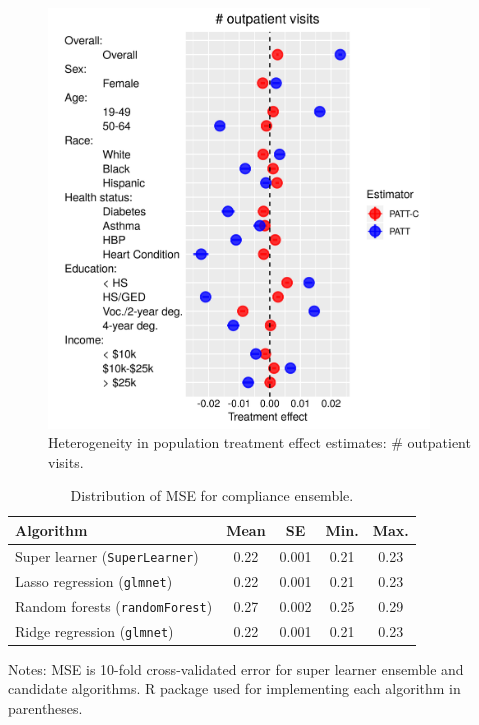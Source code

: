 \documentclass[hidelinks,12pt]{article}
\begin{document}
\begin{appendices}
\begin{figure}[htbp]
	\begin{center}
		\includegraphics[width = 0.9\textwidth]{num-out-plot.png}
		\caption{Heterogeneity in population treatment effect estimates: $\#$ outpatient visits.\label{fig:num-out-plot}}
	\end{center}
\end{figure}

\begin{table}[h]
\begin{center}
\caption{Distribution of MSE for compliance ensemble.\label{compliance-ensemble}} 
\begin{tabular}{lcccc}
  \hline
 Algorithm & Mean & SE & Min. & Max. \\ 
  \hline
        \rowcolor{Gray}
Super learner (\texttt{SuperLearner}) & 0.22  & 0.001 & 0.21 & 0.23 \\
Lasso regression (\texttt{glmnet})  & 0.22  & 0.001 & 0.21 & 0.23 \\
Random forests (\texttt{randomForest}) & 0.27  & 0.002 & 0.25 & 0.29 \\
Ridge regression (\texttt{glmnet}) & 0.22  & 0.001 & 0.21 & 0.23 \\
   \hline
\end{tabular} 
\end{center}
\footnotesize{Notes: MSE is 10-fold cross-validated error for super learner ensemble and candidate algorithms. \textsf{R} package used for implementing each algorithm in parentheses.}
\end{table}


\end{appendices}
\end{document}
